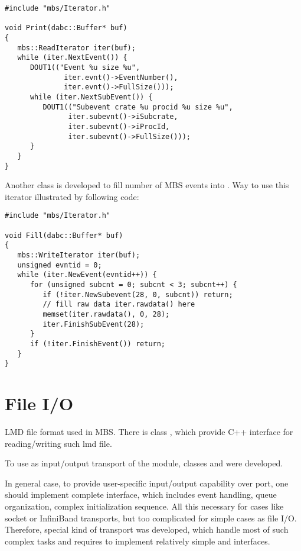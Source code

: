 \begin{small}
\begin{verbatim}
#include "mbs/Iterator.h"

void Print(dabc::Buffer* buf)
{
   mbs::ReadIterator iter(buf);
   while (iter.NextEvent()) {
      DOUT1(("Event %u size %u", 
              iter.evnt()->EventNumber(), 
              iter.evnt()->FullSize()));
      while (iter.NextSubEvent()) {
         DOUT1(("Subevent crate %u procid %u size %u",
               iter.subevnt()->iSubcrate, 
               iter.subevnt()->iProcId, 
               iter.subevnt()->FullSize()));
      }
   }
}
\end{verbatim}
\end{small}

Another class  is developed to fill number  
of MBS events into . Way to use this iterator 
illustrated by following code:

\begin{small}
\begin{verbatim}
#include "mbs/Iterator.h"

void Fill(dabc::Buffer* buf)
{
   mbs::WriteIterator iter(buf);
   unsigned evntid = 0;
   while (iter.NewEvent(evntid++)) {
      for (unsigned subcnt = 0; subcnt < 3; subcnt++) {
         if (!iter.NewSubevent(28, 0, subcnt)) return;
         // fill raw data iter.rawdata() here
         memset(iter.rawdata(), 0, 28);
         iter.FinishSubEvent(28);
      } 
      if (!iter.FinishEvent()) return;
   }
}
\end{verbatim}
\end{small}


\section{File I/O}

LMD file format used in MBS. There is class , which provide
C++ interface for reading/writing such lmd file.

To use  as input/output transport of the module, classes  
and  were developed. 

In general case, to provide user-specific input/output capability over port, 
one should implement complete  interface, which includes 
event handling, queue organization, complex initialization sequence. 
All this necessary for cases like socket or InfiniBand transports, 
but too complicated for simple cases as file I/O. Therefore, special kind of
transport  was developed, which handle most of such complex tasks
and requires to implement relatively simple  and
 interfaces.

